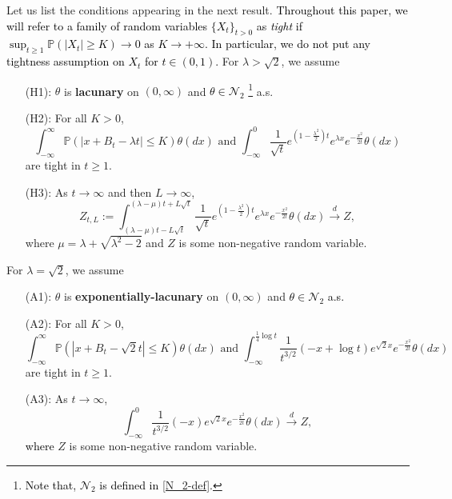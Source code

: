 \documentclass[a4paper,reqno]{amsart}%
\newcommand{\1}{\mathbf 1}
\theoremstyle{mine}
\numberwithin{theorem}{section}
\numberwithin{equation}{section}
\theoremstyle{remark}
\begin{document}
Let us list the conditions appearing in the next result. \textcolor{black}{Throughout this paper, we will refer to a family of random variables $\{X_t\}_{t>0}$ as \textit{tight} if $\sup_{t\geq 1} \mathbb{P}(|X_t|\geq K ) \to 0$ as $K\to +\infty$. In particular, we do not put any tightness assumption on $X_t$ for $t \in (0,1)$.} For $\lambda >\sqrt{2}$, we assume  \\

\begin{enumerate}
    \item [(H1):] $\theta$ is \textbf{lacunary} on $(0,\infty)$ and \textcolor{black}{$\theta \in \mathcal N_2$} \footnote{\textcolor{black}{Note that, $\mathcal N_2$ is defined in \eqref{N_2-def}.}} a.s.
    \item [(H2):] For all $K>0$,  
    \[\int_{-\infty}^{\infty} \mathbb{P}(|x+ B_t - \lambda t | \leq K)\theta(dx) \textrm{ and }\int_{- \infty}^0 \frac{1}{\sqrt{t}}e^{(1-\frac{\lambda^2}{2})t}e^{\lambda x}e^{-\frac{x^2}{2t}}\theta(dx)\] 
    are tight in $t\geq 1$. 


 \item [(H3):] As $t \to \infty$ and then $L\to \infty$, 
 \[ Z_{t,L}:=\int_{(\lambda -\mu) t - L\sqrt{t}}^{(\lambda -\mu)t + L\sqrt{t}} \frac{1}{\sqrt{t}}e^{(1-\frac{\lambda^2}{2})t}e^{\lambda x}e^{-\frac{x^2} {2t}}\theta(dx) \overset{d}{\to} Z,\]
 where $\mu = \lambda + \sqrt{\lambda^2-2}$ and $Z$ is some non-negative random variable. 
   
\end{enumerate}

\vspace{6mm}
For $\lambda = \sqrt{2}$, we assume  \\

\begin{enumerate}
    \item [(A1):] $\theta$ is \textbf{exponentially-lacunary} on $(0,\infty)$ and \textcolor{black}{$\theta \in \mathcal N_2$ a.s.}
    \item [(A2):] For all $K>0$,  
    \[\int_{-\infty}^{\infty} \mathbb{P}(|x+ B_t - \sqrt{2} t | \leq K)\theta(dx) \textrm{ and } \int_{-\infty}^{\frac{1}{4} \log t }\frac{1}{t^{3/2}}(-x + \log t)e^{\sqrt{2}x} e^{-\frac{x^2}{2t}} \theta(dx)\] 
    are tight in $t\geq 1$. 
    \item [(A3):] As $t\to \infty$, 
    \[ \int_{-\infty}^{0}\frac{1}{t^{3/2}}(-x)e^{\sqrt{2}x} e^{-\frac{x^2}{2t}} \theta(dx) \overset{d}{\to} Z,\]
    \textcolor{black}{where} $Z$ is some non-negative random variable. 
\end{enumerate}
\end{document}

